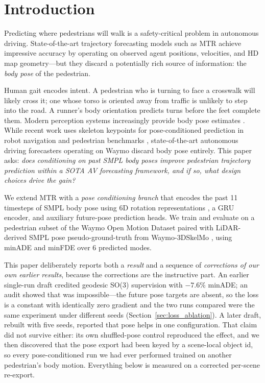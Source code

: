 \documentclass{article} %
\newcommand{\mtr}{\textsc{MTR}\xspace}
\newcommand{\minADE}{minADE\xspace}
\begin{document}
\section{Introduction}
\label{sec:intro}

Predicting where pedestrians will walk is a safety-critical problem in autonomous
driving. State-of-the-art trajectory forecasting models such as \mtr
\citep{shi2022mtr,shi2023mtrpp} achieve impressive accuracy by operating on
observed agent positions, velocities, and HD map geometry---but they discard a
potentially rich source of information: the \emph{body pose} of the pedestrian.

Human gait encodes intent. A pedestrian who is turning to face a crosswalk will
likely cross it; one whose torso is oriented away from traffic is unlikely to step
into the road. A runner's body orientation predicts turns before the feet complete
them. Modern perception systems increasingly provide body pose estimates
\citep{zhu2022motionbert}. While recent work uses skeleton keypoints for
pose-conditioned prediction in robot navigation and pedestrian benchmarks
\citep{salzmann2023robots,saadatnejad2024socialtransmotion,gao2025socialpose},
state-of-the-art autonomous driving forecasters operating on Waymo
\citep{ettinger2021waymo} discard body pose entirely.
This paper asks: \emph{does conditioning on past SMPL body poses improve
pedestrian trajectory prediction within a SOTA AV forecasting framework,
and if so, what design choices drive the gain?}

We extend \mtr with a \emph{pose conditioning branch} that encodes the past 11
timesteps of SMPL body pose \citep{loper2015smpl} using 6D rotation representations
\citep{zhou2019continuity}, a GRU encoder, and auxiliary future-pose prediction
heads. We train and evaluate on a pedestrian subset of the Waymo Open Motion
Dataset \citep{ettinger2021waymo} paired with LiDAR-derived SMPL pose
pseudo-ground-truth from Waymo-3DSkelMo \citep{zhu2025waymo3dskelmo},
using minADE and minFDE over 6 predicted modes.

This paper deliberately reports both a \emph{result} and a sequence of
\emph{corrections of our own earlier results}, because the corrections are the
instructive part. An earlier single-run draft credited geodesic SO(3) supervision
with $-7.6\%$ \minADE; an audit showed that was impossible---the future pose
targets are absent, so the loss is a constant with identically zero gradient and
the two runs compared were the same experiment under different seeds
(Section~\ref{sec:loss_ablation}). A later draft, rebuilt with five seeds, reported
that pose helps in one configuration. That claim did not survive either: its own
shuffled-pose control reproduced the effect, and we then discovered that the pose
export had been keyed by a scene-local object id, so every pose-conditioned run we
had ever performed trained on another pedestrian's body motion. Everything below
is measured on a corrected per-scene re-export.
\end{document}

